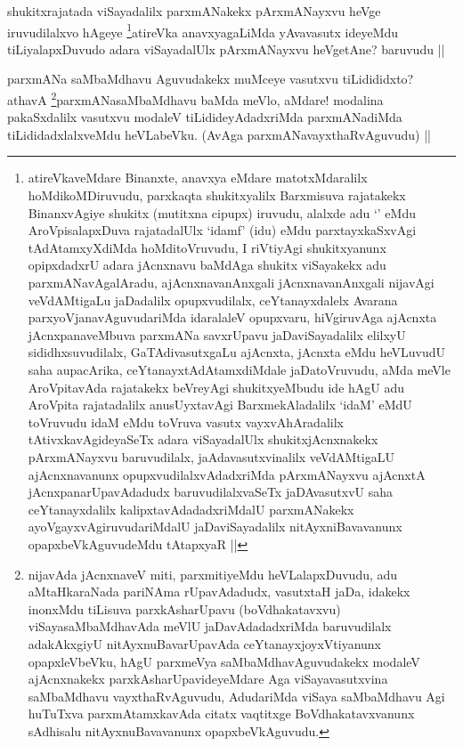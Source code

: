 \begin{artha}
shukitxrajatada viSayadalilx parxmANakekx pArxmANayxvu heVge iruvudilalxvo hAgeye \footnote{atireVkaveMdare Binanxte, anavxya eMdare matotxMdaralilx hoMdikoMDiruvudu, parxkaqta shukitxyalilx Barxmisuva rajatakekx BinanxvAgiye shukitx (mutitxna cipupx) iruvudu, alalxde adu `\stext' eMdu AroVpisalapxDuva rajatadalUlx `idamf' (idu) eMdu parxtayxkaSxvAgi tAdAtamxyXdiMda hoMditoVruvudu, I riVtiyAgi shukitxyanunx opipxdadxrU adara jAcnxnavu baMdAga shukitx viSayakekx adu parxmANavAgalAradu, ajAcnxnavanAnxgali jAcnxnavanAnxgali nijavAgi veVdAMtigaLu jaDadalilx opupxvudilalx, ceYtanayxdalelx Avarana parxyoVjanavAguvudariMda idaralaleV opupxvaru, hiVgiruvAga ajAcnxta jAcnxpanaveMbuva parxmANa savxrUpavu jaDaviSayadalilx elilxyU sididhxsuvudilalx, GaTAdivasutxgaLu ajAcnxta, jAcnxta eMdu heVLuvudU saha aupacArika, ceYtanayxtAdAtamxdiMdale jaDatoVruvudu, aMda meVle AroVpitavAda rajatakekx beVreyAgi shukitxyeMbudu ide hAgU adu AroVpita rajatadalilx anusUyxtavAgi BarxmekAladalilx `idaM' eMdU toVruvudu idaM eMdu toVruva vasutx vayxvAhAradalilx tAtivxkavAgideyaSeTx adara viSayadalUlx shukitxjAcnxnakekx pArxmANayxvu baruvudilalx, jaAdavasutxvinalilx veVdAMtigaLU ajAcnxnavanunx opupxvudilalxvAdadxriMda pArxmANayxvu ajAcnxtA jAcnxpanarUpavAdadudx baruvudilalxvaSeTx jaDAvasutxvU saha ceYtanayxdalilx kalipxtavAdadadxriMdalU parxmANakekx ayoVgayxvAgiruvudariMdalU jaDaviSayadalilx nitAyxniBavavanunx opapxbeVkAguvudeMdu tAtapxyaR ||}atireVka anavxyagaLiMda yAvavasutx ideyeMdu tiLiyalapxDuvudo adara viSayadalUlx pArxmANayxvu heVgetAne? baruvudu ||
\end{artha}

\begin{artha}
parxmANa saMbaMdhavu Aguvudakekx muMceye vasutxvu tiLidididxto? athavA \footnote{nijavAda jAcnxnaveV miti, parxmitiyeMdu heVLalapxDuvudu, adu aMtaHkaraNada pariNAma rUpavAdadudx, vasutxtaH jaDa, idakekx inonxMdu tiLisuva parxkAsharUpavu (boVdhakatavxvu) viSayasaMbaMdhavAda meVlU jaDavAdadadxriMda baruvudilalx adakAkxgiyU nitAyxnuBavarUpavAda ceYtanayxjoyxVtiyanunx opapxleVbeVku, hAgU parxmeVya saMbaMdhavAguvudakekx modaleV ajAcnxnakekx parxkAsharUpavideyeMdare Aga viSayavasutxvina saMbaMdhavu vayxthaRvAguvudu, AdudariMda viSaya saMbaMdhavu Agi huTuTxva parxmAtamxkavAda citatx vaqtitxge BoVdhakatavxvanunx sAdhisalu nitAyxnuBavavanunx opapxbeVkAguvudu.}parxmANasaMbaMdhavu baMda meVlo, aMdare! modalina pakaSxdalilx vasutxvu modaleV tiLidideyAdadxriMda parxmANadiMda tiLididadxlalxveMdu heVLabeVku. (AvAga parxmANavayxthaRvAguvudu) ||
\end{artha}

